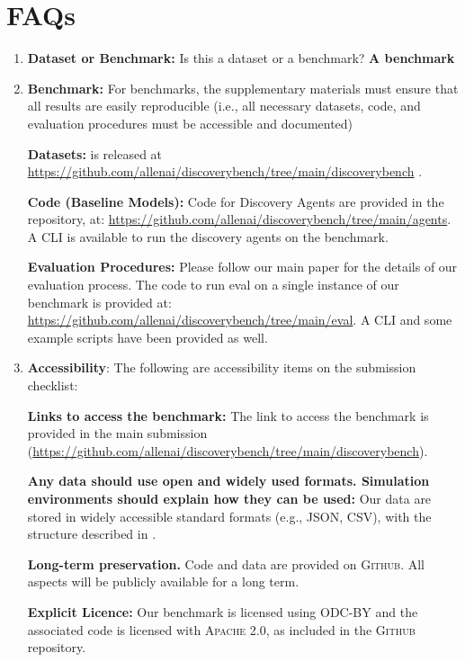 \appendix

\section{FAQs}
\begin{enumerate}
    \item \textbf{Dataset or Benchmark:} Is this a dataset or a benchmark? {\textbf{A benchmark}}
    
    \item \textbf{Benchmark:} For benchmarks, the supplementary materials must ensure that all results are easily reproducible (i.e., all necessary datasets, code, and evaluation procedures must be accessible and documented)
    
    \textbf{Datasets:} \discoverybench{} is released at \url{https://github.com/allenai/discoverybench/tree/main/discoverybench} . 

    \textbf{Code (Baseline Models):} Code for Discovery Agents are provided in the repository, at: \url{https://github.com/allenai/discoverybench/tree/main/agents}. A CLI is available to run the discovery agents on the benchmark. 

    \textbf{Evaluation Procedures:} Please follow our main paper for the details of our evaluation process. The code to run eval on a single instance of our benchmark is provided at: \url{https://github.com/allenai/discoverybench/tree/main/eval}. A CLI and some example scripts have been provided as well. 

    \item{\textbf{Accessibility}: The following are accessibility items on the submission checklist:}

    \textbf{Links to access the benchmark:} The link to access the benchmark is provided in the main submission (\url{https://github.com/allenai/discoverybench/tree/main/discoverybench}). 

    \textbf{Any data should use open and widely used formats. Simulation environments should explain how they can be used:} Our data are stored in widely accessible standard formats (e.g., \textsc{JSON, CSV}), with the structure described in  .  

    \textbf{Long-term preservation.} Code and data are provided on \textsc{Github}.  All aspects will be publicly available for a long term.

    \textbf{Explicit Licence:} Our benchmark is licensed using \textsc{ODC-BY} and the associated code is licensed with \textsc{Apache 2.0}, as included in the \textsc{Github} repository. 


\end{enumerate}
